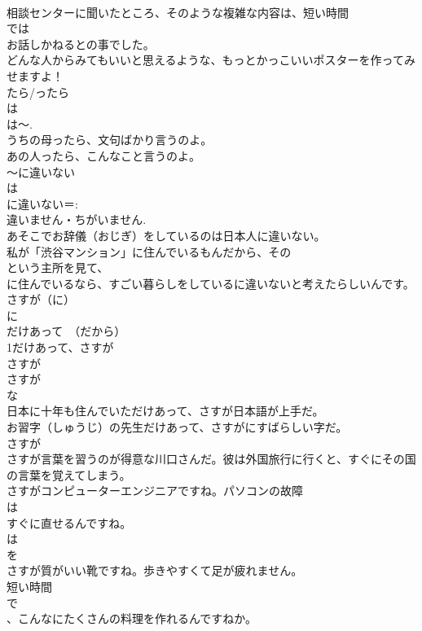 \documentclass[8pt]{extreport}
\begin{document}
\begin{CJK}{UTF8}{min}
\\	相談センターに聞いたところ、そのような複雑な内容は、短い時間
\\	では
\\	お話しかねるとの事でした。
\\	どんな人からみてもいいと思えるような、もっとかっこいいポスターを作ってみせますよ！
\\	たら/ったら
\\	は 
\\	は～.
\\	うちの母ったら、文句ばかり言うのよ。
\\	あの人ったら、こんなこと言うのよ。
\\	～に違いない
\\	は
\\	に違いない＝: 
\\	違いません・ちがいません.
\\	あそこでお辞儀（おじぎ）をしているのは日本人に違いない。
\\	私が「渋谷マンション」に住んでいるもんだから、その
\\	という主所を見て、
\\	に住んでいるなら、すごい暮らしをしているに違いないと考えたらしいんです。
\\	さすが（に）
\\	に 
\\	だけあって　（だから）
\\	1だけあって、さすが
\\	さすが
\\	さすが
\\	な
\\	日本に十年も住んでいただけあって、さすが日本語が上手だ。
\\	お習字（しゅうじ）の先生だけあって、さすがにすばらしい字だ。
\\	さすが
\\	さすが言葉を習うのが得意な川口さんだ。彼は外国旅行に行くと、すぐにその国の言葉を覚えてしまう。
\\	さすがコンピューターエンジニアですね。パソコンの故障
\\	は
\\	すぐに直せるんですね。
\\	は 
\\	を 
\\	さすが質がいい靴ですね。歩きやすくて足が疲れません。
\\	短い時間
\\	で
\\	、こんなにたくさんの料理を作れるんですねか。

\end{CJK}
\end{document}
